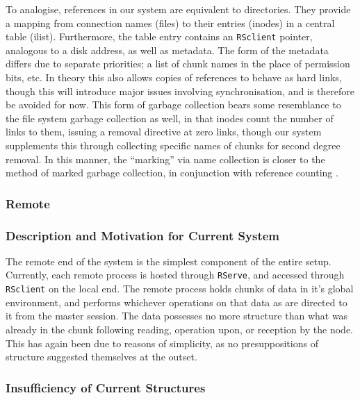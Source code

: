 To analogise, references in our system are equivalent to directories.
They provide a mapping from connection names (files) to their entries
(inodes) in a central table (ilist). Furthermore, the table entry
contains an \texttt{RSclient} pointer, analogous to a disk address, as
well as metadata. The form of the metadata differs due to separate
priorities; a list of chunk names in the place of permission bits, etc.
In theory this also allows copies of references to behave as hard links,
though this will introduce major issues involving synchronisation, and
is therefore be avoided for now. This form of garbage collection bears
some resemblance to the file system garbage collection as well, in that
inodes count the number of links to them, issuing a removal directive at
zero links, though our system supplements this through collecting
specific names of chunks for second degree removal. In this manner, the
``marking'' via name collection is closer to the method of marked
garbage collection, in conjunction with reference counting
\cite{knuth1}.

\hypertarget{remote}{%
\subsubsection{Remote}\label{remote}}

\hypertarget{description-and-motivation-for-current-system}{%
\subsubsection{Description and Motivation for Current
System}\label{description-and-motivation-for-current-system}}

The remote end of the system is the simplest component of the entire
setup. Currently, each remote \R process is hosted through
\texttt{RServe}, and accessed through \texttt{RSclient} on the local
end. The remote \R process holds chunks of data in it's global
environment, and performs whichever operations on that data as are
directed to it from the master \R session. The data possesses no more
structure than what was already in the chunk following reading,
operation upon, or reception by the node. This has again been due to
reasons of simplicity, as no presuppositions of structure suggested
themselves at the outset.

\hypertarget{insufficiency-of-current-structures-1}{%
\subsubsection{Insufficiency of Current
Structures}\label{insufficiency-of-current-structures-1}}

